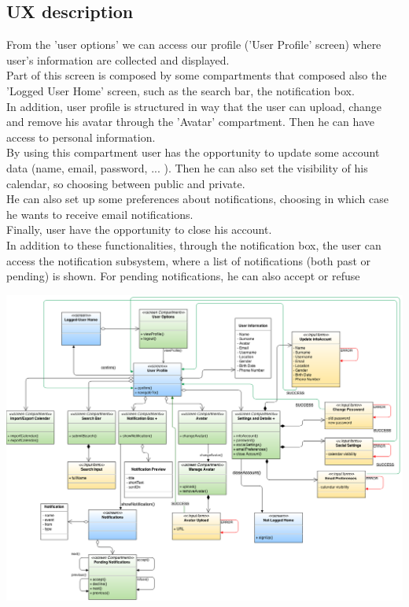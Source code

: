 \documentclass[12pt]{book}
\begin{document}
\subsection{UX description}
From the 'user options' we can access our profile ('User Profile' screen) where user's information are collected and displayed. \\
Part of this screen is composed by some compartments that composed also the 'Logged User Home' screen, such as the search bar, the notification box. \\ 
In addition, user profile is structured in way that the user can upload, change and remove his avatar through the 'Avatar' compartment. Then he can have access to personal information. \\
By using this compartment user has the opportunity to update some account data (name, email, password, ... ). Then he can also set the visibility of his calendar, so choosing between public and private. \\
He can also set up some preferences about notifications, choosing in which case he wants to receive email notifications. \\
Finally, user have the opportunity to close his account. \\
In addition to these functionalities, through the notification box, the user can access the  notification subsystem, where a list of notifications (both past or pending) is shown. For pending notifications, he can also accept or refuse \\
\begin{landscape}
\begin{center}
\includegraphics[scale=0.45]{profile_management_UX}\\
\end{center}
\end{landscape}
\end{document}

